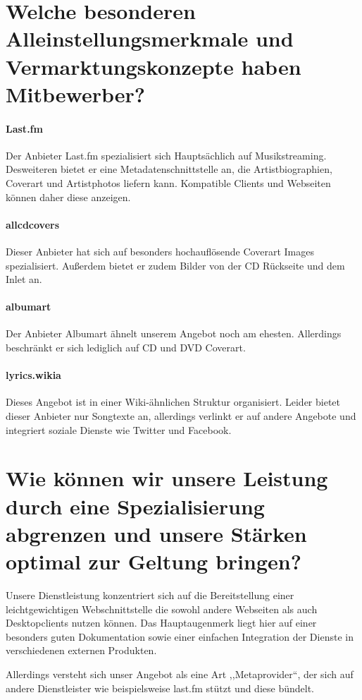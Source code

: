 \documentclass[11pt]{scrreprt}
\begin{document}
\section{Welche besonderen Alleinstellungsmerkmale und
Vermarktungskonzepte haben Mitbewerber?}

\paragraph{Last.fm}
Der Anbieter Last.fm spezialisiert sich Hauptsächlich auf Musikstreaming.
Desweiteren bietet er eine Metadatenschnittstelle an, die Artistbiographien,
Coverart und Artistphotos liefern kann. Kompatible Clients und Webseiten können
daher diese anzeigen.


\paragraph{allcdcovers}
Dieser Anbieter hat sich auf besonders hochauflösende Coverart Images
spezialisiert. Außerdem bietet er zudem Bilder von der CD Rückseite und dem
Inlet an.

\paragraph{albumart}
Der Anbieter Albumart ähnelt unserem Angebot noch am ehesten. Allerdings
beschränkt er sich lediglich auf CD und DVD Coverart.


\paragraph{lyrics.wikia}
Dieses Angebot ist in einer Wiki-ähnlichen Struktur organisiert. Leider bietet
dieser Anbieter nur Songtexte an, allerdings verlinkt er auf andere Angebote und
integriert soziale Dienste wie Twitter und Facebook.


\section{Wie können wir unsere Leistung durch eine
    Spezialisierung abgrenzen und unsere Stärken
optimal zur Geltung bringen?}
Unsere Dienstleistung konzentriert sich auf die Bereitstellung einer
leichtgewichtigen Webschnittstelle die sowohl andere Webseiten als auch
Desktopclients nutzen können. Das Hauptaugenmerk liegt hier auf einer besonders
guten Dokumentation sowie einer einfachen Integration der Dienste in
verschiedenen externen Produkten.

Allerdings versteht sich unser Angebot als eine Art ,,Metaprovider``, der sich
auf andere Dienstleister wie beispielsweise last.fm stützt und diese bündelt.
\end{document}
